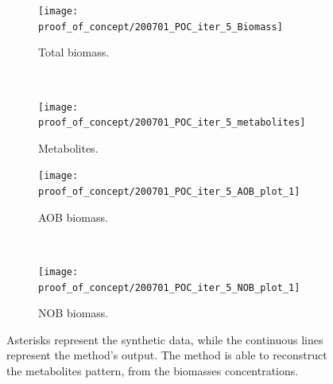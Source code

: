 \documentclass[processes,article,submit,moreauthors,pdftex]{Definitions/mdpi}
\begin{document}
\begin{figure}[h]
	\centering
	\begin{subfigure}{0.45 \linewidth}
		\texttt{[image: proof\_of\_concept/200701\_POC\_iter\_5\_Biomass]}
		\caption{Total biomass.}
		\label{PC_total_biomass}
	\end{subfigure}
	~
	\begin{subfigure}{0.45 \linewidth}
		\texttt{[image: proof\_of\_concept/200701\_POC\_iter\_5\_metabolites]}
		\caption{Metabolites. }
		\label{PC_metabolites}
	\end{subfigure}
	
	\begin{subfigure}{0.45 \linewidth}
		\texttt{[image: proof\_of\_concept/200701\_POC\_iter\_5\_AOB\_plot\_1]}
		\caption{AOB biomass.}
		\label{PC_AOB}
	\end{subfigure}
	~
	\begin{subfigure}{0.45 \linewidth}
		\texttt{[image: proof\_of\_concept/200701\_POC\_iter\_5\_NOB\_plot\_1]}
		\caption{NOB biomass. }
		\label{PC_NOB}
	\end{subfigure}
	\caption{Asterisks represent the synthetic data, while the continuous lines represent the method's output. The method is able to reconstruct the metabolites pattern, from the biomasses concentrations.}
	\label{POC_tracking}
\end{figure}
\end{document}
